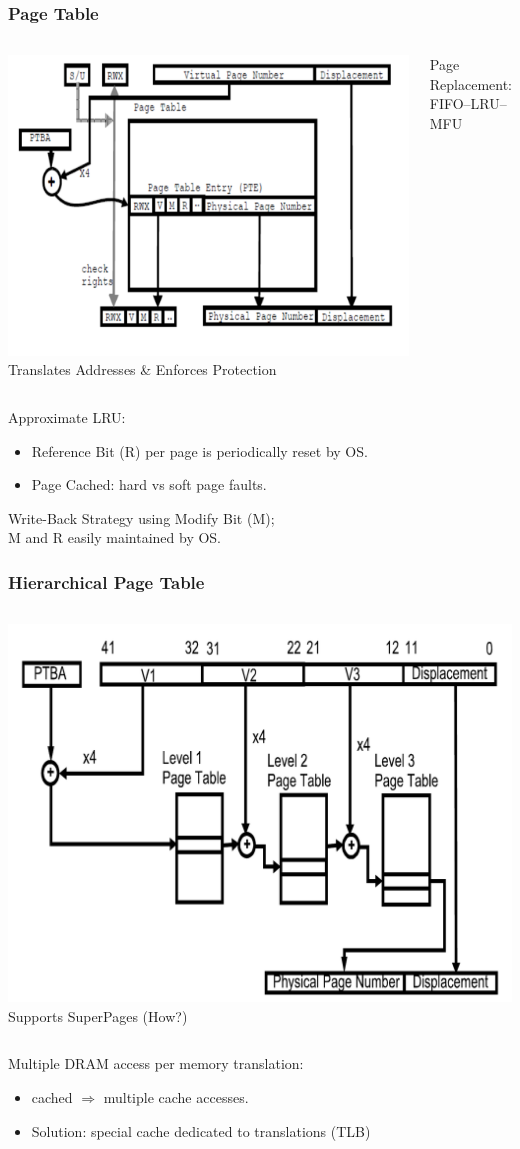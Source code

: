 \documentclass{beamer}
\begin{document}
\begin{frame}[fragile,t]
\frametitle{Page Table}

\begin{columns}
\includegraphics[width=40ex]{Figures/FigsMemH/PageTable}
Translates Addresses \& Enforces Protection\smallskip

Page Replacement: FIFO--LRU--MFU
\end{columns}

Approximate LRU:
\begin{itemize}
\item Reference Bit (R) per page is periodically reset by OS.
\item Page Cached: hard vs soft page faults.
\end{itemize}\bigskip

Write-Back Strategy using Modify Bit (M);\\
M and R easily maintained by OS.

\end{frame}


\begin{frame}[fragile,t]
\frametitle{Hierarchical Page Table}

\begin{columns}
\includegraphics[width=40ex]{Figures/FigsMemH/HierarchPageTable}
Supports SuperPages (How?)\smallskip


\end{columns}

Multiple DRAM access per memory translation:
\begin{itemize}
\item cached $\Rightarrow$ multiple cache accesses.
\item Solution: special cache dedicated to translations (TLB)
\end{itemize}\bigskip

\end{frame}
\end{document}
